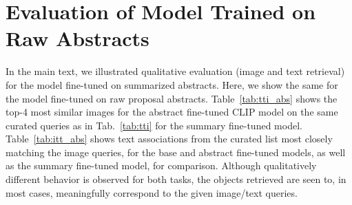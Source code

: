 \documentclass[10pt]{article} %
\begin{document}

\section{Evaluation of Model Trained on Raw Abstracts}
\label{app:eval_raw}

In the main text, we illustrated qualitative evaluation (image and text retrieval) for the model fine-tuned on summarized abstracts. Here, we show the same for the model fine-tuned on raw proposal abstracts. Table~\ref{tab:tti_abs} shows the top-4 most similar images for the abstract fine-tuned CLIP model on the same curated queries as in Tab.~\ref{tab:tti} for the summary fine-tuned model. Table~\ref{tab:itt_abs} shows text associations from the curated list most closely matching the image queries, for the base and abstract fine-tuned models, as well as the summary fine-tuned model, for comparison. Although qualitatively different behavior is observed for both tasks, the objects retrieved are seen to, in most cases, meaningfully correspond to the given image/text queries.
\end{document}
